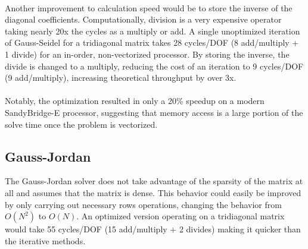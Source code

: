 \documentclass[12pt,twocolumn]{article}
\begin{document}
\paragraph{}Another improvement to calculation speed would be to store the inverse of the diagonal coefficients. Computationally,
division is a very expensive operator taking nearly 20x the cycles as a multiply or add. A single unoptimized iteration 
of Gauss-Seidel for a tridiagonal matrix takes 28 cycles/DOF (8 add/multiply + 1 divide) for an in-order, non-vectorized processor.
By storing the inverse, the divide is changed to a multiply, reducing the cost of an iteration to 9 cycles/DOF (9 add/multiply), increasing theoretical throughput by over 3x. 
\paragraph{}Notably, the optimization resulted in only a 20\% speedup on a modern SandyBridge-E processor, suggesting that memory access is a large portion of the solve time once the problem is vectorized.
\subsection*{Gauss-Jordan}
The Gauss-Jordan solver does not take advantage of the sparsity of the matrix at all and assumes that the matrix is dense. This behavior 
could easily be improved by only carrying out necessary rows operations, changing the behavior from $O(N^2)$ to $O(N)$. An optimized version 
operating on a tridiagonal matrix would take 55 cycles/DOF (15 add/multiply + 2 divides) making it quicker than the iterative methods.
\end{document}
